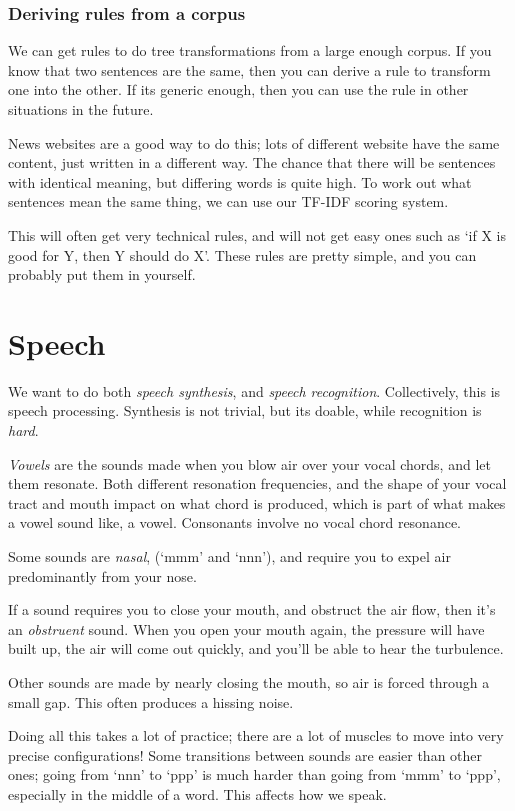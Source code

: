 \subsubsection{Deriving rules from a corpus}

We can get rules to do tree transformations from a large enough corpus. If you
know that two sentences are the same, then you can derive a rule to transform
one into the other. If its generic enough, then you can use the rule in other
situations in the future.

News websites are a good way to do this; lots of different website have the same
content, just written in a different way. The chance that there will be
sentences with identical meaning, but differing words is quite high. To work out
what sentences mean the same thing, we can use our TF-IDF scoring system.

This will often get very technical rules, and will not get easy ones such as `if
X is good for Y, then Y should do X'. These rules are pretty simple, and you can
probably put them in yourself.

\section{Speech}

We want to do both \textit{speech synthesis}, and \textit{speech recognition}.
Collectively, this is speech processing. Synthesis is not trivial, but its
doable, while recognition is \textit{hard}.

\textit{Vowels} are the sounds made when you blow air over your vocal chords,
and let them resonate. Both different resonation frequencies, and the shape of
your vocal tract and mouth impact on what chord is produced, which is part of
what makes a vowel sound like, a vowel. Consonants involve no vocal chord
resonance.

Some sounds are \textit{nasal}, (`mmm' and `nnn'), and require you to expel air
predominantly from your nose.

If a sound requires you to close your mouth, and obstruct the air flow, then
it's an \textit{obstruent} sound. When you open your mouth again, the pressure
will have built up, the air will come out quickly, and you'll be able to hear
the turbulence.

Other sounds are made by nearly closing the mouth, so air is forced through a
small gap. This often produces a hissing noise.

Doing all this takes a lot of practice; there are a lot of muscles to move into
very precise configurations! Some transitions between sounds are easier than
other ones; going from `nnn' to `ppp' is much harder than going from `mmm' to
`ppp', especially in the middle of a word. This affects how we speak.

